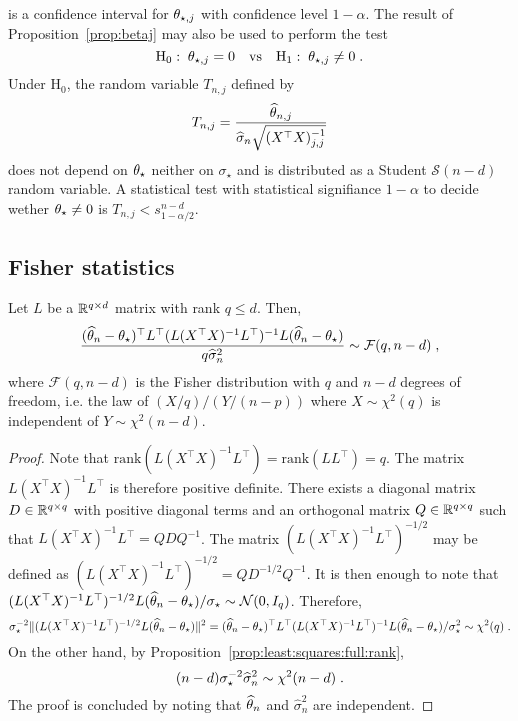  is a confidence interval for $\theta_{\star,j}$ with confidence level $1-\alpha$. The result of Proposition~\ref{prop:betaj} may also be used to perform the test 
\[
\mathrm{H}_0:\; \theta_{\star,j} = 0 \quad\mathrm{vs} \quad \mathrm{H}_1:\; \theta_{\star,j} \neq 0\;.
\]
Under $\mathrm{H}_0$, the random variable $T_{n,j}$ defined by 
\[
T_{n,j} = \frac{\widehat {\theta}_{n,j}}{\widehat\sigma_{n}\sqrt{(X^\top X)_{j,j}^{-1}}} 
\] 
does not depend  on $\theta_{\star}$ neither on $\sigma_{\star}$ and is distributed as a Student $\mathcal{S}(n-d)$ random variable. A statistical test with statistical signifiance $1-\alpha$ to decide wether $\theta_{\star}\neq 0$ is $T_{n,j}<s_{1-\alpha/2}^{n-d}$. 
\subsection*{Fisher statistics}
\begin{shaded}
\begin{proposition}
\label{prop:Lbeta}
Let $L$ be a $\mathbb{R}^{q\times d}$ matrix with rank $q\leqslant d$. Then,
\[
\frac{(\widehat {\theta}_{n} -\theta_{\star})^\top L^\top(L(X^\top X)^{-1}L^\top)^{-1}L(\widehat {\theta}_{n} -\theta_{\star})}{q\widehat\sigma^2_{n}} \sim \mathcal{F}(q,n-d)\;,
\]
where $\mathcal{F}(q,n-d)$ is the Fisher distribution with $q$ and $n-d$ degrees of freedom, i.e. the law of $(X/q)/(Y/(n-p))$ where $X\sim\chi^2(q)$ is independent of $Y\sim\chi^2(n-d)$.
\end{proposition}
\end{shaded}
\begin{proof}
Note that $\mathrm{rank}(L(X^\top X)^{-1}L^\top) = \mathrm{rank}(LL^\top)  = q$. The matrix $L(X^\top X)^{-1}L^\top$ is therefore positive definite. There exists a diagonal matrix $D\in\mathbb{R}^{q\times q}$ with positive diagonal terms and an orthogonal matrix $Q\in\mathbb{R}^{q\times q}$ such that $L(X^\top X)^{-1}L^\top = QDQ^{-1}$. The matrix $(L(X^\top X)^{-1}L^\top)^{-1/2}$ may be defined as $(L(X^\top X)^{-1}L^\top)^{-1/2} = QD^{-1/2}Q^{-1}$. It is then enough to note that $(L(X^\top X)^{-1}L^\top)^{-1/2}L(\widehat {\theta}_{n} -\theta_{\star})/\sigma_{\star}\sim \mathcal{N}(0,I_q)$. Therefore,
\[
\sigma^{-2}_{\star}\|(L(X^\top X)^{-1}L^\top)^{-1/2}L(\widehat {\theta}_{n} -\theta_{\star})\|^2 = (\widehat {\theta}_{n} -\theta_{\star})^\top L^\top(L(X^\top X)^{-1}L^\top)^{-1}L(\widehat {\theta}_{n} -\theta_{\star})/\sigma^2_{\star} \sim \chi^2(q)\;.
\]
On the other hand, by Proposition~\ref{prop:least:squares:full:rank}, 
\[
(n-d)\sigma^{-2}_{\star}\widehat\sigma^2_{n} \sim \chi^2(n-d)\;.
\]
The proof is concluded by noting that $\widehat {\theta}_n$ and  $\widehat\sigma^2_{n}$ are independent.
\end{proof}
